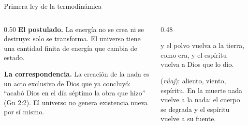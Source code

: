\begin{frame}{Primera ley de la termodinámica}
\begin{columns}[t,onlytextwidth]
\begin{column}{0.50\textwidth}\small
\textbf{El postulado.} La energía no se crea ni se destruye: solo se transforma. El universo tiene una cantidad finita de energía que cambia de estado.\par\medskip
\textbf{La correspondencia.} La creación de la nada es un acto exclusivo de Dios que ya concluyó: ``acabó Dios en el día séptimo la obra que hizo'' (Gn 2:2). El universo no genera existencia nueva por sí mismo.
\end{column}
\begin{column}{0.48\textwidth}
\begin{cita}y el polvo vuelva a la tierra, como era, y el espíritu vuelva a Dios que lo dio.\end{cita}
\begin{center}\end{center}
\scriptsize{} (\emph{rúaj}): aliento, viento, espíritu. En la muerte nada vuelve a la nada: el cuerpo se degrada y el espíritu vuelve a su fuente.\par\smallskip
{}
\end{column}
\end{columns}
\end{frame}

